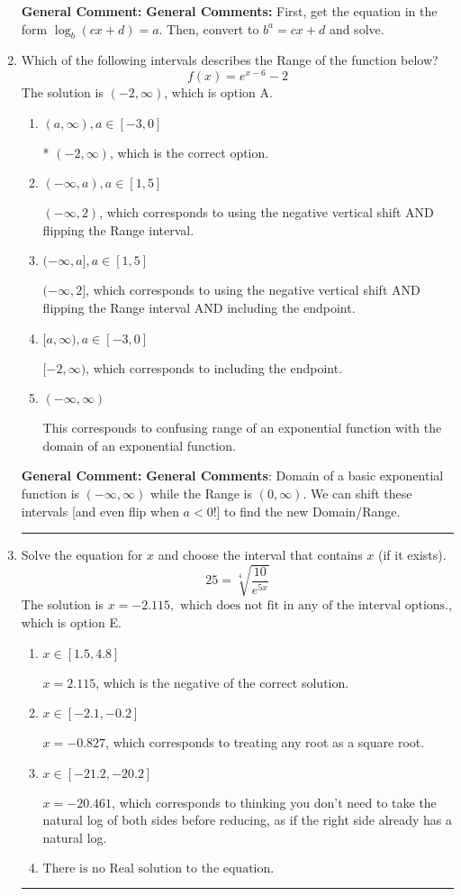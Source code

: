 \documentclass{extbook}[14pt]
\newcommand{\litem}[1]{\item #1

\rule{\textwidth}{0.4pt}}
\begin{document}
\begin{enumerate}
{\textbf{General Comment:} \textbf{General Comments:} First, get the equation in the form $\log_b{(cx+d)} = a$. Then, convert to $b^a = cx+d$ and solve.
}
\litem{
Which of the following intervals describes the Range of the function below?
\[ f(x) = e^{x-6}-2 \]The solution is \( (-2, \infty) \), which is option A.\begin{enumerate}[label=\Alph*.]
\item \( (a, \infty), a \in [-3, 0] \)

* $(-2, \infty)$, which is the correct option.
\item \( (-\infty, a), a \in [1, 5] \)

$(-\infty, 2)$, which corresponds to using the negative vertical shift AND flipping the Range interval.
\item \( (-\infty, a], a \in [1, 5] \)

$(-\infty, 2]$, which corresponds to using the negative vertical shift AND flipping the Range interval AND including the endpoint.
\item \( [a, \infty), a \in [-3, 0] \)

$[-2, \infty)$, which corresponds to including the endpoint.
\item \( (-\infty, \infty) \)

This corresponds to confusing range of an exponential function with the domain of an exponential function.
\end{enumerate}

\textbf{General Comment:} \textbf{General Comments}: Domain of a basic exponential function is $(-\infty, \infty)$ while the Range is $(0, \infty)$. We can shift these intervals [and even flip when $a<0$!] to find the new Domain/Range.
}
\litem{
 Solve the equation for $x$ and choose the interval that contains $x$ (if it exists).
\[  25 = \sqrt[4]{\frac{10}{e^{5x}}} \]The solution is \( x = -2.115, \text{ which does not fit in any of the interval options.} \), which is option E.\begin{enumerate}[label=\Alph*.]
\item \( x \in [1.5, 4.8] \)

$x = 2.115$, which is the negative of the correct solution.
\item \( x \in [-2.1, -0.2] \)

$x = -0.827$, which corresponds to treating any root as a square root.
\item \( x \in [-21.2, -20.2] \)

$x = -20.461$, which corresponds to thinking you don't need to take the natural log of both sides before reducing, as if the right side already has a natural log.
\item \( \text{There is no Real solution to the equation.} \)


\end{enumerate}}
\end{enumerate}
\end{document}
